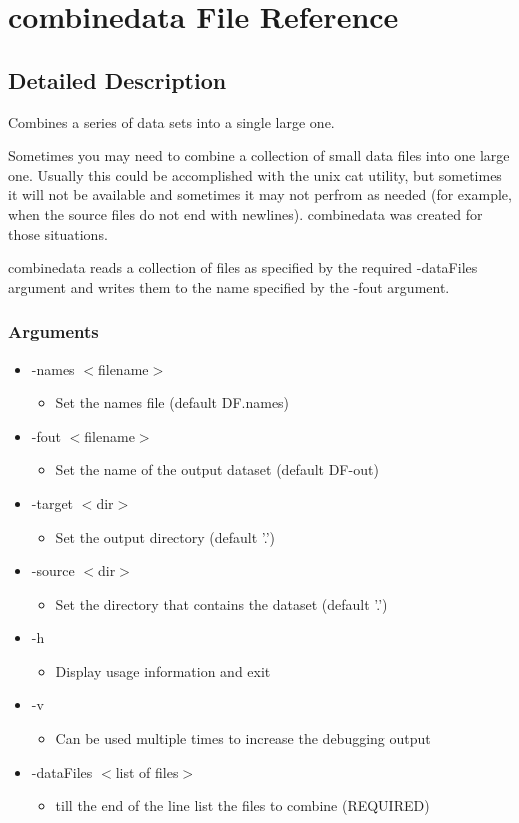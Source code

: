 \section{combinedata File Reference}
\label{combinedata}


\subsection{Detailed Description}
Combines a series of data sets into a single large one. 

Sometimes you may need to combine a collection of small data files into one large one. Usually this could be accomplished with the unix cat utility, but sometimes it will not be available and sometimes it may not perfrom as needed (for example, when the source files do not end with newlines). combinedata was created for those situations.

combinedata reads a collection of files as specified by the required -data\-Files argument and writes them to the name specified by the -fout argument.

\subsubsection*{Arguments}

\begin{itemize}
\item -names $<$filename$>$\begin{itemize}
\item Set the names file (default DF.names)\end{itemize}
\item -fout $<$filename$>$\begin{itemize}
\item Set the name of the output dataset (default DF-out)\end{itemize}
\item -target $<$dir$>$\begin{itemize}
\item Set the output directory (default '.')\end{itemize}
\item -source $<$dir$>$\begin{itemize}
\item Set the directory that contains the dataset (default '.')\end{itemize}
\item -h\begin{itemize}
\item Display usage information and exit\end{itemize}
\item -v\begin{itemize}
\item Can be used multiple times to increase the debugging output\end{itemize}
\item -data\-Files $<$list of files$>$\begin{itemize}
\item till the end of the line list the files to combine (REQUIRED)\end{itemize}
\end{itemize}


